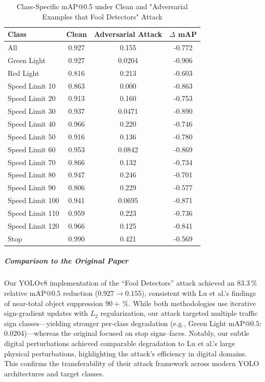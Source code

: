 \documentclass[../main.tex]{subfiles}
\begin{document}
\begin{table}[H]
    \centering
    \caption{Class-Specific mAP@0.5 under Clean and "Adversarial Examples that Fool Detectors" Attack}
    \label{tab:yolo_fool_class_results}
    \footnotesize
    \begin{tabular}{@{\hspace{0.3cm}}lS[table-format=1.3]S[table-format=1.3]S[table-format=-1.3]@{\hspace{0.3cm}}}
        \toprule
        \textbf{Class} & {\textbf{Clean}} & {\textbf{Adversarial Attack}} & {\textbf{$\Delta$ mAP}} \\
        \midrule
        All            & 0.927 & 0.155 & -0.772 \\
        Green Light    & 0.927 & 0.0204 & -0.906 \\
        Red Light      & 0.816 & 0.213 & -0.603 \\
        Speed Limit 10 & 0.863 & 0.000 & -0.863 \\
        Speed Limit 20 & 0.913 & 0.160 & -0.753 \\
        Speed Limit 30 & 0.937 & 0.0471 & -0.890 \\
        Speed Limit 40 & 0.966 & 0.220 & -0.746 \\
        Speed Limit 50 & 0.916 & 0.136 & -0.780 \\
        Speed Limit 60 & 0.953 & 0.0842 & -0.869 \\
        Speed Limit 70 & 0.866 & 0.132 & -0.734 \\
        Speed Limit 80 & 0.947 & 0.246 & -0.701 \\
        Speed Limit 90 & 0.806 & 0.229 & -0.577 \\
        Speed Limit 100 & 0.941 & 0.0695 & -0.871 \\
        Speed Limit 110 & 0.959 & 0.223 & -0.736 \\
        Speed Limit 120 & 0.966 & 0.125 & -0.841 \\
        Stop           & 0.990 & 0.421 & -0.569 \\
        \bottomrule
    \end{tabular}
\end{table}

\subparagraph{Comparison to the Original Paper}  
Our YOLOv8 implementation of the ``Fool Detectors'' attack achieved an $83.3\,\%$ relative $\text{mAP@0.5}$ reduction ($0.927 \rightarrow 0.155$), consistent with Lu et al.'s findings of near-total object suppression $90+\,\%$\cite{lu2017fooldetectors}. While both methodologies use iterative sign-gradient updates with $L_2$ regularization, our attack targeted multiple traffic sign classes---yielding stronger per-class degradation (e.g., Green Light $\text{mAP@0.5}$: $0.0204$)---whereas the original focused on stop signs--faces. Notably, our subtle digital perturbations achieved comparable degradation to Lu et al.'s large physical perturbations, highlighting the attack's efficiency in digital domains. This confirms the transferability of their attack framework across modern YOLO architectures and target classes.
\end{document}
